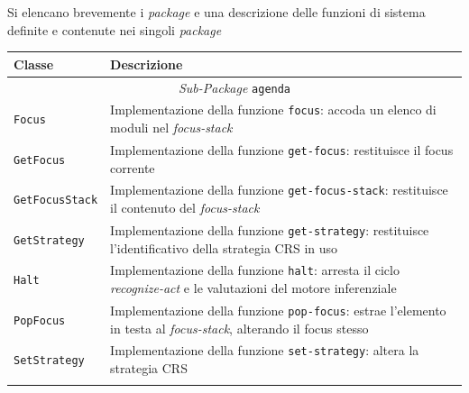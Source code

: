 Si elencano brevemente i \emph{package} e una descrizione delle funzioni di sistema definite e contenute nei singoli \emph{package}

\begin{longtable}{p{3.5cm}p{8.5cm}}
\hline 
\textbf{Classe} & \textbf{Descrizione} \\ 
\hline\hline 
\endhead

\multicolumn{2}{c}{\emph{Sub-Package} \texttt{agenda}}\\
	\hdashline[5pt/5pt]
		\texttt{Focus} & Implementazione della funzione \texttt{focus}: accoda un elenco di moduli nel \emph{focus-stack} \\ 
	\hdashline[1pt/5pt]
		\texttt{GetFocus} & Implementazione della funzione \texttt{get-focus}: restituisce il focus corrente \\ 
	\hdashline[1pt/5pt]
		\texttt{GetFocusStack} & Implementazione della funzione \texttt{get-focus-stack}: restituisce il contenuto del \emph{focus-stack} \\ 
	\hdashline[1pt/5pt]
		\texttt{GetStrategy} & Implementazione della funzione \texttt{get-strategy}: restituisce l'identificativo della strategia CRS in uso \\ 
	\hdashline[1pt/5pt]
		\texttt{Halt} & Implementazione della funzione \texttt{halt}: arresta il ciclo \emph{recognize-act} e le valutazioni del motore inferenziale \\ 
	\hdashline[1pt/5pt]
		\texttt{PopFocus} & Implementazione della funzione \texttt{pop-focus}: estrae l'elemento in testa al \emph{focus-stack}, alterando il focus stesso \\ 
	\hdashline[1pt/5pt]
		\texttt{SetStrategy} & Implementazione della funzione \texttt{set-strategy}: altera la strategia CRS\\ 
	\hline\\
		

\end{longtable}
